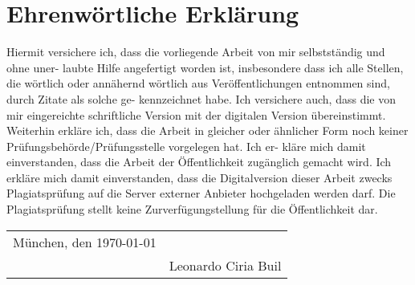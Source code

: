 \newpage

\chapter*{Ehrenwörtliche Erklärung}

Hiermit versichere ich, dass die vorliegende Arbeit von mir selbstständig und ohne uner- laubte Hilfe angefertigt worden ist, insbesondere dass ich alle Stellen, die wörtlich oder annähernd wörtlich aus Veröffentlichungen entnommen sind, durch Zitate als solche ge- kennzeichnet habe. Ich versichere auch, dass die von mir eingereichte schriftliche Version mit der digitalen Version übereinstimmt. Weiterhin erkläre ich, dass die Arbeit in gleicher oder ähnlicher Form noch keiner Prüfungsbehörde/Prüfungsstelle vorgelegen hat. Ich er- kläre mich damit einverstanden, dass die Arbeit der Öffentlichkeit zugänglich gemacht wird. Ich erkläre mich damit einverstanden, dass die Digitalversion dieser Arbeit zwecks Plagiatsprüfung auf die Server externer Anbieter hochgeladen werden darf. Die Plagiatsprüfung stellt keine Zurverfügungstellung für die Öffentlichkeit dar.

\vspace{6cm}
\begin{tabular}{@{}p{6cm}p{6cm}@{}}
    München, den \today & \hrulefill          \\
                        & Leonardo Ciria Buil \\
\end{tabular}